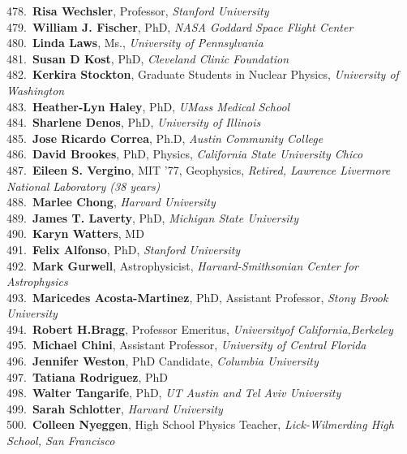 478.~{\bf Risa Wechsler}, Professor, {\sl Stanford University} \\
479.~{\bf William J. Fischer}, PhD, {\sl NASA Goddard Space Flight Center} \\
480.~{\bf Linda Laws}, Ms., {\sl University of Pennsylvania } \\
481.~{\bf Susan D Kost}, PhD, {\sl Cleveland Clinic Foundation} \\
482.~{\bf Kerkira Stockton}, Graduate Students in Nuclear Physics, {\sl University of Washington} \\
483.~{\bf Heather-Lyn Haley}, PhD, {\sl UMass Medical School} \\
484.~{\bf Sharlene Denos}, PhD, {\sl University of Illinois} \\
485.~{\bf Jose Ricardo Correa}, Ph.D, {\sl Austin Community College} \\
486.~{\bf David Brookes}, PhD, Physics, {\sl California State University Chico } \\
487.~{\bf Eileen S. Vergino}, MIT '77, Geophysics, {\sl Retired, Lawrence Livermore National Laboratory (38 years)} \\
488.~{\bf Marlee Chong}, {\sl Harvard University} \\
489.~{\bf James T. Laverty}, PhD, {\sl Michigan State University} \\
490.~{\bf Karyn Watters}, MD \\
491.~{\bf Felix Alfonso}, PhD, {\sl Stanford University} \\
492.~{\bf Mark Gurwell}, Astrophysicist, {\sl Harvard-Smithsonian Center for Astrophysics} \\
493.~{\bf Maricedes Acosta-Martinez}, PhD, Assistant Professor, {\sl Stony Brook University} \\
494.~{\bf Robert H.Bragg}, Professor Emeritus, {\sl Universityof California,Berkeley} \\
495.~{\bf Michael Chini}, Assistant Professor, {\sl University of Central Florida } \\
496.~{\bf Jennifer Weston}, PhD Candidate, {\sl Columbia University} \\
497.~{\bf Tatiana Rodriguez}, PhD \\
498.~{\bf Walter Tangarife}, PhD, {\sl UT Austin and Tel Aviv University} \\
499.~{\bf Sarah Schlotter}, {\sl Harvard University} \\
500.~{\bf Colleen Nyeggen}, High School Physics Teacher, {\sl Lick-Wilmerding High School, San Francisco} \\
